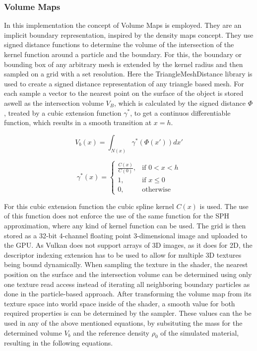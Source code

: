 \documentclass[intern]{cgMA}
\begin{document}
    \subsubsection*{Volume Maps}
    In this implementation the concept of Volume Maps is employed. They are an implicit boundary representation, inspired by the density maps concept. They use signed distance functions to determine the volume of the intersection of the kernel function around a particle and the boundary. For this, the boundary or bounding box of any arbitrary mesh is extended by the kernel radius and then sampled on a grid with a set resolution. Here the TriangleMeshDistance library is used to create a signed distance representation of any triangle based mesh. For each sample a vector to the nearest point on the surface of the object is stored aswell as the intersection volume $V_B$, which is calculated by the signed distance $\Phi$, treated by a cubic extension function $\gamma^*$, to get a continuos differentiable function, which results in a smooth transition at $x = h$. \cite{10.1145/3359566.3360077}

    \begin{equation}
        V_b(x) = \int_{N(x)}\gamma^*(\Phi(x'))dx'
    \end{equation}

    \begin{equation}
        \gamma^*(x) = 
        \begin{cases}
            \frac{C(x)}{C(0)},& \text{if } 0 < x < h \\
            1,& \text{if } x \leq 0 \\
            0,              & \text{otherwise}
        \end{cases}
    \end{equation}

    For this cubic extension function the cubic spline kernel $C(x)$ \cite{doi:10.1146/annurev.aa.30.090192.002551} is used. The use of this function does not enforce the use of the same function for the SPH approximation, where any kind of kernel function can be used. \cite{10.1145/3359566.3360077}
    The grid is then stored as a 32-bit 4-channel floating point 3-dimensional image and uploaded to the GPU. As Vulkan does not support arrays of 3D images, as it does for 2D, the descriptor indexing extension has to be used to allow for multiple 3D textures being bound dynamically. When sampling the texture in the shader, the nearest position on the surface and the intersection volume can be determined using only one texture read access instead of iterating all neighboring boundary particles as done in the particle-based approach. After transforming the volume map from its texture space into world space inside of the shader, a smooth value for both required properties is can be determined by the sampler. These values can the be used in any of the above mentioned equations, by subsituting the mass for the determined volume $V_b$ and the reference density $\rho_0$ of the simulated material, resulting in the following equations.
\end{document}
